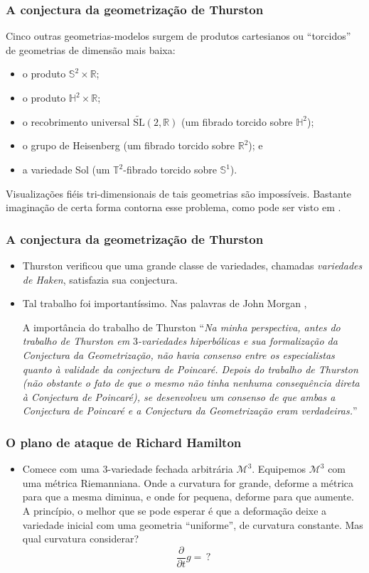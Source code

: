 \documentclass{beamer}
\newcommand{\mm}{\mathcal{M}}
\newcommand{\quotes}[1]{``#1''}
\begin{document}
\begin{frame}
\frametitle{A conjectura da geometrização de Thurston}
Cinco outras geometrias-modelos surgem de produtos cartesianos ou \quotes{torcidos} de geometrias de dimensão mais baixa:
\begin{itemize}
\item o produto $\mathbb{S}^2 \times \mathbb{R}$;
\item o produto $\mathbb{H}^2 \times \mathbb{R}$;
\item o recobrimento universal $\widetilde{\mathrm{S L}}(2, \mathbb{R})$ (um fibrado torcido sobre $\mathbb{H}^2$);
\item o grupo de Heisenberg (um fibrado torcido sobre $\mathbb{R}^2$); e
\item a variedade Sol (um $\mathbb{T}^2$-fibrado torcido sobre $\mathbb{S}^1$).
\end{itemize}
Visualizações fiéis tri-dimensionais de tais geometrias são impossíveis. Bastante imaginação de certa forma contorna esse problema, como pode ser visto em \textbf{\textcolor{blue}{\cite{space}}}.
\end{frame}

\begin{frame}
\frametitle{A conjectura da geometrização de Thurston}
\begin{itemize}
\item Thurston verificou que uma grande classe de variedades, chamadas \emph{variedades de Haken}, satisfazia sua conjectura.
\item Tal trabalho foi importantíssimo. Nas palavras de John Morgan \textbf{\textcolor{blue}{\cite{p4}}}, 
\begin{block}{A importância do trabalho de Thurston}
\quotes{\textit{Na minha perspectiva, antes do trabalho de Thurston em $3$-variedades hiperbólicas e sua formalização da Conjectura da Geometrização, não havia consenso entre os especialistas quanto à validade da conjectura de Poincaré. Depois do trabalho de Thurston (não obstante o fato de que o mesmo não tinha nenhuma consequência direta à Conjectura de Poincaré), se desenvolveu um consenso de que ambas a Conjectura de Poincaré e a Conjectura da Geometrização eram verdadeiras.}}
\end{block}
\end{itemize}
\end{frame}

\begin{frame}
\frametitle{O plano de ataque de Richard Hamilton}
\begin{itemize}
\item Comece com uma 3-variedade fechada arbitrária $\mm^3$. Equipemos $\mm^3$ com uma métrica Riemanniana. Onde a curvatura for grande, deforme a métrica para que a mesma diminua, e onde for pequena, deforme para que aumente. A princípio, o melhor que se pode esperar é que a deformação deixe a variedade inicial com uma geometria \quotes{uniforme}, de curvatura constante. Mas qual curvatura considerar?
\[
\frac{\partial}{\partial t} g = \, ?
\]
\end{itemize} 


\end{frame}
\end{document}
